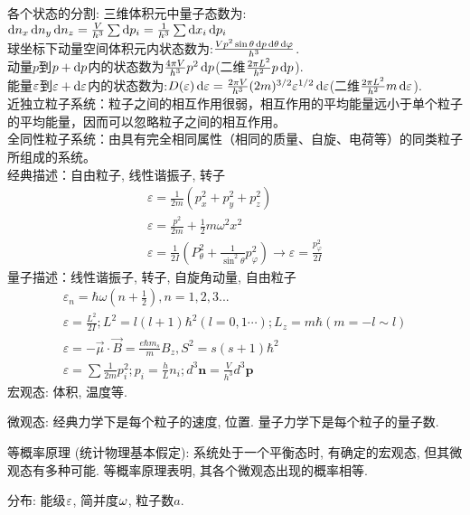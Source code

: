 \documentclass[UTF8,9pt]{ctexart}
\newcommand{\q}[1]{{\color{red} #1}}
\begin{document}
各个状态的分割: 三维体积元中量子态数为: $\mathop{}\!\mathrm{d} n_x\mathop{}\!\mathrm{d} n_y\mathop{}\!\mathrm{d} n_z = \frac{V}{h^3}\sum \mathop{}\!\mathrm{d} p_i = \frac{1}{h^3}\sum \mathop{}\!\mathrm{d} x_i\mathop{}\!\mathrm{d} p_i$\\
球坐标下动量空间体积元内状态数为:$\frac{Vp^2\sin\theta\mathop{}\!\mathrm{d} p\mathop{}\!\mathrm{d} \theta \mathop{}\!\mathrm{d} \varphi}{h^3}$. \\
动量$p$到$p+\mathop{}\!\mathrm{d} p$内的状态数为$\frac{4\pi V}{h^3} p^2\mathop{}\!\mathrm{d} p$(二维$\frac{2\pi L^2}{h^2}p\mathop{}\!\mathrm{d} p$).\\
能量$\varepsilon$到$\varepsilon+\mathop{}\!\mathrm{d}\varepsilon$内的状态数为:$D(\varepsilon)\mathop{}\!\mathrm{d}\varepsilon=\frac{2\pi V}{h^3}(2m)^{3/2}\varepsilon^{1/2}\mathop{}\!\mathrm{d}\varepsilon$(二维$\frac{2\pi L^2}{h^2}m\mathop{}\!\mathrm{d}\varepsilon$).\\
\q{近独立粒子系统}：粒子之间的相互作用很弱，相互作用的平均能量远小于单个粒子的平均能量，因而可以忽略粒子之间的相互作用。 \\
\q{全同性粒子系统}：由具有完全相同属性（相同的质量、自旋、电荷等）的同类粒子所组成的系统。\\
经典描述：自由粒子, 线性谐振子, 转子
$$\begin{array}{l}
    {\varepsilon=\frac{1}{2 m}\left(p_{x}^{2}+p_{y}^{2}+p_{z}^{2}\right)} \\ 
    {\varepsilon=\frac{p^{2}}{2 m}+\frac{1}{2} m \omega^{2} x^{2}} \\ 
    {\varepsilon=\frac{1}{2 I}\left(P_{\theta}^{2}+\frac{1}{\sin ^{2} \theta} p_{\varphi}^{2}\right) \rightarrow \varepsilon=\frac{p_{\varphi}^{2}}{2 I}}
\end{array}$$
量子描述：线性谐振子, 转子, 自旋角动量, 自由粒子
$$ 
\begin{array}{l}
    {\varepsilon_{n}=\hbar \omega\left(n+\frac{1}{2}\right)}, n=1,2,3... \\ 
    {\varepsilon=\frac{L^{2}}{2 I} ; L^{2}=l(l+1) \hbar^{2}(l=0,1\cdots) ; L_{z}=m \hbar(m=-l\sim l)} \\ 
    {\varepsilon=-\vec{\mu} \cdot \vec{B}=\frac{e \hbar m_{s}}{m} B_{z}, S^2=s(s+1)\hbar^2} \\ 
    {\varepsilon=\sum \frac{1}{2 m}p_i^2 ; p_{i}=\frac{h}{L} n_{i} ; d^3\bm{n}=\frac{V}{h^{3}} d^3 \bm{p}}
\end{array}
 $$
    宏观态: 体积, 温度等. 

    微观态: 经典力学下是每个粒子的速度, 位置. 量子力学下是每个粒子的量子数. 

    等概率原理 (统计物理基本假定): 系统处于一个平衡态时, 有确定的宏观态, 但其微观态有多种可能. 等概率原理表明, 其各个微观态出现的概率相等. 

    分布: 能级$\varepsilon$, 简并度$\omega$, 粒子数$a$. 
\end{document}

